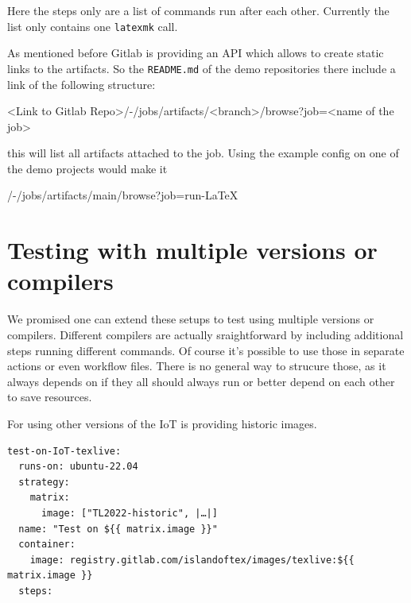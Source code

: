 \documentclass[final]{ltugboat}
\newcommand*{\TeXLive}{\acro{\TeX\,Live}}
\newcommand*{\command}[1]{\texttt{#1}}
\newcommand*{\file}[1]{\texttt{#1}}
\begin{document}
\inputminted[breaklines,breakafter=/]{yaml}{examples/latex-basic-gitlab.yml}

Here the steps only are a list of commands run after each other. Currently the list only contains one \command{latexmk} call.

As mentioned before Gitlab is providing an API which allows to create static links to the artifacts.
So the \file{README.md} of the demo repositories there include a link of the following structure:

<Link to Gitlab Repo>/-/jobs/artifacts/<branch>/browse?job=<name of the job>

this will list all artifacts attached to the job.
Using the example config on one of the demo projects would make it

/-/jobs/artifacts/main/browse?job=run-LaTeX

\section{Testing with multiple versions or compilers}

We promised one can extend these setups to test using multiple versions or compilers.
Different compilers are actually sraightforward by including additional steps running different commands.
Of course it's possible to use those in separate actions or even workflow files.
There is no general way to strucure those, as it always depends on if they all should always run or better depend on each other to save resources.

For using other versions of \TeXLive{} the IoT is providing historic images.

\begin{verbatim}
test-on-IoT-texlive:
  runs-on: ubuntu-22.04
  strategy:
    matrix:
      image: ["TL2022-historic", |…|]
  name: "Test on ${{ matrix.image }}"
  container:
    image: registry.gitlab.com/islandoftex/images/texlive:${{ matrix.image }}
  steps:
\end{verbatim}

\end{document}
